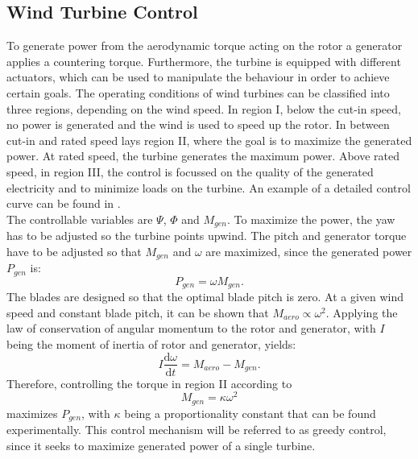 \subsection{Wind Turbine Control}
\label{sec:WTC}
To generate power from the aerodynamic torque acting on the rotor a generator applies a countering torque. Furthermore, the turbine is equipped with different actuators, which can be used to manipulate the behaviour in order to achieve certain goals. The operating conditions of wind turbines can be classified into three regions, depending on the wind speed. In region I, below the cut-in speed, no power is generated and the wind is used to speed up the rotor. In between cut-in and rated speed lays region II, where the goal is to maximize the generated power. At rated speed, the turbine generates the maximum power. Above rated speed, in region III, the control is focussed on the quality of the generated electricity and to minimize loads on the turbine. An example of a detailed control curve can be found in \cite{jonkman_definition_2009}. \cite{boersma_tutorial_2017} \\
The controllable variables are $\Psi$, $\Phi$ and $M_{gen}$. To maximize the power, the yaw has to be adjusted so the turbine points upwind. The pitch and generator torque have to be adjusted so that $M_{gen}$ and $\omega$ are maximized, since the generated power $P_{gen}$ is:
\begin{equation}
	P_{gen} = \omega M_{gen}.
\end{equation} The blades are designed so that the optimal blade pitch is zero. At a given wind speed and constant blade pitch, it can be shown that $M_{aero} \propto \omega^2$. Applying the law of conservation of angular momentum to the rotor and generator, with $I$ being the moment of inertia of rotor and generator, yields:
\begin{equation}
	I\frac{\mathrm{d}\omega}{\mathrm{d}t} = M_{aero} - M_{gen}. \label{eq:ang_mom}
\end{equation}
Therefore, controlling the torque in region II according to
\begin{equation}
	M_{gen} = \kappa \omega^2 \label{eq:control}
\end{equation} maximizes $P_{gen}$, with $\kappa$ being a proportionality constant that can be found experimentally. This control mechanism will be referred to as greedy control, since it seeks to maximize generated power of a single turbine. \cite[p.63 - 77]{hansen_aerodynamics_2008}
